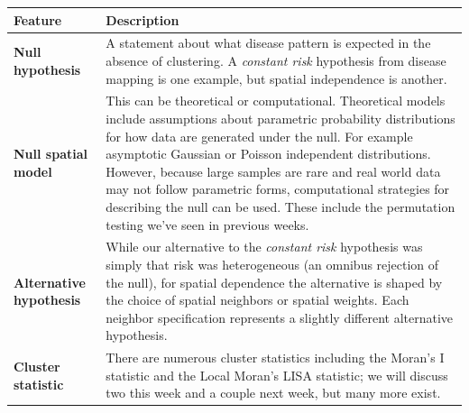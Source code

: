 \documentclass[
]{book}
\begin{document}
\begin{longtable}[]{@{}ll@{}}
\toprule
\begin{minipage}[b]{0.24\columnwidth}\raggedright
Feature\strut
\end{minipage} & \begin{minipage}[b]{0.70\columnwidth}\raggedright
Description\strut
\end{minipage}\tabularnewline
\midrule
\endhead
\begin{minipage}[t]{0.24\columnwidth}\raggedright
\textbf{Null hypothesis}\strut
\end{minipage} & \begin{minipage}[t]{0.70\columnwidth}\raggedright
A statement about what disease pattern is expected in the absence of clustering. A \emph{constant risk} hypothesis from disease mapping is one example, but spatial independence is another.\strut
\end{minipage}\tabularnewline
\begin{minipage}[t]{0.24\columnwidth}\raggedright
\textbf{Null spatial model}\strut
\end{minipage} & \begin{minipage}[t]{0.70\columnwidth}\raggedright
This can be theoretical or computational. Theoretical models include assumptions about parametric probability distributions for how data are generated under the null. For example asymptotic Gaussian or Poisson independent distributions. However, because large samples are rare and real world data may not follow parametric forms, computational strategies for describing the null can be used. These include the permutation testing we've seen in previous weeks.\strut
\end{minipage}\tabularnewline
\begin{minipage}[t]{0.24\columnwidth}\raggedright
\textbf{Alternative hypothesis}\strut
\end{minipage} & \begin{minipage}[t]{0.70\columnwidth}\raggedright
While our alternative to the \emph{constant risk} hypothesis was simply that risk was heterogeneous (an omnibus rejection of the null), for spatial dependence the alternative is shaped by the choice of spatial neighbors or spatial weights. Each neighbor specification represents a slightly different alternative hypothesis.\strut
\end{minipage}\tabularnewline
\begin{minipage}[t]{0.24\columnwidth}\raggedright
\textbf{Cluster statistic}\strut
\end{minipage} & \begin{minipage}[t]{0.70\columnwidth}\raggedright
There are numerous cluster statistics including the Moran's I statistic and the Local Moran's LISA statistic; we will discuss two this week and a couple next week, but many more exist.\strut
\end{minipage}\tabularnewline
\bottomrule
\end{longtable}
\end{document}

